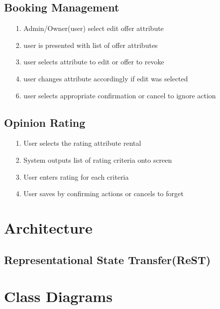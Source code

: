 \subsection {Booking Management}
 \begin{itemize}
		\item[1.] Admin/Owner(user) select edit offer attribute
		\item[2.] user is presented with list of offer attributes
		\item[3.] user selects attribute to edit or offer to revoke
		\item[4.] user changes attribute accordingly if edit was selected
		\item[6.] user selects appropriate confirmation or cancel to ignore action
\end{itemize}
\subsection {Opinion Rating}
\begin{itemize}
\item[1.] User selects the rating attribute  rental
\item[2.] System outputs list of rating criteria onto screen
\item[3.] User enters rating for each criteria
\item[4.] User saves by confirming actions or cancels to forget
\end{itemize}
\section{Architecture}
\subsection{Representational State Transfer(ReST)}

\section{Class Diagrams}
